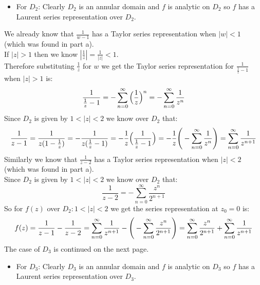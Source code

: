 \documentclass{article}
\begin{document}
\break
\begin{itemize}
    \item For $D_2$: Clearly $D_2$ is an annular domain and $f$ is analytic on $D_2$ so $f$ has a Laurent series representation over $D_2$.
\end{itemize}
\begin{center}
    \doublespacing
    We already know that $\frac{1}{w - 1}$ has a Taylor series representation when $|w| < 1$ (which was found in part a).
    \\If $|z| > 1$ then we know $|\frac{1}{z}| =\frac{1}{|z|} < 1$.
    \\Therefore substituting $\frac{1}{z}$ for $w$ we get the Taylor series representation for $\frac{1}{\frac{1}{z} - 1}$ when $|z| > 1$ is:
    \[\frac{1}{\frac{1}{z} - 1} = -\sum _{n=0}^{\infty}\Big{(}\frac{1}{z}\Big{)}^n = -\sum _{n=0}^{\infty}\frac{1}{z^n}\]
    Since $D_2$ is given by $1 < |z| < 2$ we know over $D_2$ that:
    \[\frac{1}{z - 1} =\frac{1}{z(1 -\frac{1}{z})} = -\frac{1}{z(\frac{1}{z} - 1)} = -\frac{1}{z}\Big{(}\frac{1}{\frac{1}{z} - 1}\Big{)} = -\frac{1}{z}\Bigg{(}-\sum _{n=0}^{\infty}\frac{1}{z^n}\Bigg{)} =\sum _{n=0}^{\infty}\frac{1}{z^{n+1}}\]
    Similarly we know that $\frac{1}{z - 2}$ has a Taylor series representation when $|z| < 2$ (which was found in part a).
    \\Since $D_2$ is given by $1 < |z| < 2$ we know over $D_2$ that:
    \[\frac{1}{z - 2} = -\sum _{n=0}^{\infty}\frac{z^n}{2^{n+1}}\]
    So for $f(z)$ over $D_2: 1 < |z| < 2$ we get the series representation at $z_0 = 0$ is:
    \[f(z) =\frac{1}{z - 1} -\frac{1}{z - 2} =\sum _{n=0}^{\infty}\frac{1}{z^{n+1}} -\Bigg{(}-\sum _{n=0}^{\infty}\frac{z^n}{2^{n+1}}\Bigg{)} =\sum _{n=0}^{\infty}\frac{z^n}{2^{n+1}} +\sum _{n=0}^{\infty}\frac{1}{z^{n+1}}\]
    \break
    \newline\newline\newline\newline\newline\newline
    The case of $D_3$ is continued on the next page.
\end{center}
\break
\begin{itemize}
    \item For $D_3$: Clearly $D_3$ is an annular domain and $f$ is analytic on $D_3$ so $f$ has a Laurent series representation over $D_3$.
\end{itemize}
\end{document}
